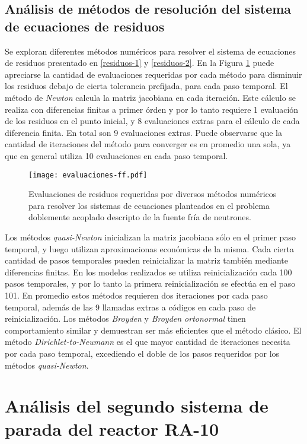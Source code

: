 \subsection*{Análisis de métodos de resolución del sistema de ecuaciones de residuos}

Se exploran diferentes métodos numéricos para resolver el sistema de ecuaciones de residuos presentado en \ref{residuos-1} y \ref{residuos-2}.
En la Figura \ref{iteraciones_ri} puede apreciarse la cantidad de evaluaciones requeridas 
por cada método para disminuir los residuos debajo de cierta tolerancia prefijada, para cada paso temporal.
El método de \textit{Newton} calcula la matriz jacobiana en cada iteración.
Este cálculo se realiza con diferencias finitas a primer órden y por lo tanto requiere 1 evaluación de los residuos en el punto inicial, y 8 evaluaciones extras para el cálculo de cada diferencia finita.
En total son 9 evaluaciones extras.
Puede observarse que la cantidad de iteraciones del método para converger es en promedio una sola, ya que en general utiliza 10 evaluaciones en cada paso temporal.

\begin{figure}['ht]
\centering{}\texttt{[image: evaluaciones-ff.pdf]}
\caption{Evaluaciones de residuos requeridas por diversos métodos numéricos para resolver los sistemas de ecuaciones planteados
 en el problema doblemente acoplado descripto de la fuente fría de neutrones.} \label{iteraciones_ri} 
\end{figure}

Los métodos \textit{quasi-Newton} inicializan la matriz jacobiana sólo en el primer paso temporal,
y luego utilizan aproximacionas económicas de la misma. 
Cada cierta cantidad de pasos temporales pueden reinicializar la matriz también mediante diferencias finitas. 
En los modelos realizados se utiliza reinicialización cada 100 pasos temporales, 
y por lo tanto la primera reinicialización se efectúa en el paso 101.
En promedio estos métodos requieren dos iteraciones por cada paso temporal, 
además de las 9 llamadas extras a códigos en cada paso de reinicialización.
Los métodos \textit{Broyden} y \textit{Broyden ortonormal} tinen comportamiento similar y demuestran ser más eficientes que el método clásico.
El método \textit{Dirichlet-to-Neumann} es el que mayor cantidad de iteraciones necesita por cada paso temporal, 
excediendo el doble de los pasos requeridos por los métodos \textit{quasi-Newton}.

\section{Análisis del segundo sistema de parada del reactor RA-10}
\label{3:ra10}

